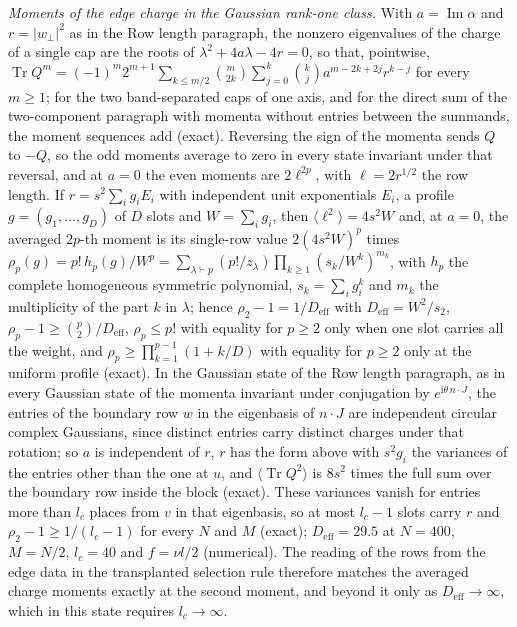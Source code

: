 \emph{Moments of the edge charge in the Gaussian rank-one class.} With \(a=\operatorname{Im}\alpha\) and \(r=|w_\perp|^{2}\) as in the Row length paragraph, the nonzero eigenvalues of the charge of a single cap are the roots of \(\lambda^{2}+4a\lambda-4r=0\), so that, pointwise, \(\operatorname{Tr}Q^{m}=(-1)^{m}2^{m+1}\sum_{k\le m/2}\binom{m}{2k}\sum_{j=0}^{k}\binom{k}{j}a^{m-2k+2j}r^{k-j}\) for every \(m\ge1\); for the two band-separated caps of one axis, and for the direct sum of the two-component paragraph with momenta without entries between the summands, the moment sequences add (exact). Reversing the sign of the momenta sends \(Q\) to \(-Q\), so the odd moments average to zero in every state invariant under that reversal, and at \(a=0\) the even moments are \(2\ell^{2p}\), with \(\ell=2r^{1/2}\) the row length. If \(r=s^{2}\sum_{i}g_{i}E_{i}\) with independent unit exponentials \(E_{i}\), a profile \(g=(g_{1},\dots,g_{D})\) of \(D\) slots and \(W=\sum_{i}g_{i}\), then \(\langle\ell^{2}\rangle=4s^{2}W\) and, at \(a=0\), the averaged \(2p\)-th moment is its single-row value \(2(4s^{2}W)^{p}\) times \(\rho_{p}(g)=p!\,h_{p}(g)/W^{p}=\sum_{\lambda\vdash p}(p!/z_{\lambda})\prod_{k\ge1}(s_{k}/W^{k})^{m_{k}}\), with \(h_{p}\) the complete homogeneous symmetric polynomial, \(s_{k}=\sum_{i}g_{i}^{k}\) and \(m_{k}\) the multiplicity of the part \(k\) in \(\lambda\); hence \(\rho_{2}-1=1/D_{\mathrm{eff}}\) with \(D_{\mathrm{eff}}=W^{2}/s_{2}\), \(\rho_{p}-1\ge\binom{p}{2}/D_{\mathrm{eff}}\), \(\rho_{p}\le p!\) with equality for \(p\ge2\) only when one slot carries all the weight, and \(\rho_{p}\ge\prod_{k=1}^{p-1}(1+k/D)\) with equality for \(p\ge2\) only at the uniform profile (exact). In the Gaussian state of the Row length paragraph, as in every Gaussian state of the momenta invariant under conjugation by \(e^{\mathrm i\theta\,n\cdot J}\), the entries of the boundary row \(w\) in the eigenbasis of \(n\cdot J\) are independent circular complex Gaussians, since distinct entries carry distinct charges under that rotation; so \(a\) is independent of \(r\), \(r\) has the form above with \(s^{2}g_{i}\) the variances of the entries other than the one at \(u\), and \(\langle\operatorname{Tr}Q^{2}\rangle\) is \(8s^{2}\) times the full sum over the boundary row inside the block (exact). These variances vanish for entries more than \(l_c\) places from \(v\) in that eigenbasis, so at most \(l_c-1\) slots carry \(r\) and \(\rho_{2}-1\ge1/(l_c-1)\) for every \(N\) and \(M\) (exact); \(D_{\mathrm{eff}}=29.5\) at \(N=400\), \(M=N/2\), \(l_c=40\) and \(f=\nu l/2\) (numerical). The reading of the rows from the edge data in the transplanted selection rule therefore matches the averaged charge moments exactly at the second moment, and beyond it only as \(D_{\mathrm{eff}}\to\infty\), which in this state requires \(l_c\to\infty\).


